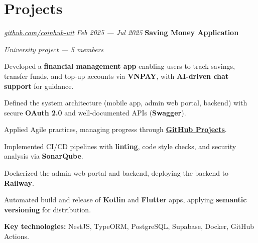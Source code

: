\section{Projects}

\begin{twocolentry}{
		\textit{\href{https://github.com/coinhub-uit}{github.com/coinhub-uit}}
		\textit{Feb 2025 --- Jul 2025}
	}
	\textbf{Saving Money Application}

	\textit{University project — 5 members}
\end{twocolentry}

\begin{onecolentry}
	\begin{highlights}
		\item Developed a \textbf{financial management app} enabling users to track savings, transfer funds, and
		top-up accounts via \textbf{VNPAY}, with \textbf{AI-driven chat support} for guidance.
		\item Defined the system architecture (mobile app, admin web portal, backend) with secure \textbf{OAuth
			2.0} and well-documented APIs (\textbf{Swagger}).
		\item Applied Agile practices, managing progress through
		\textbf{\href{https://github.com/orgs/coinhub-uit/projects/1}{GitHub Projects}}.
		\item Implemented CI/CD pipelines with \textbf{linting}, code style checks, and security analysis via
		\textbf{SonarQube}.
		\item Dockerized the admin web portal and backend, deploying the backend to \textbf{Railway}.
		\item Automated build and release of \textbf{Kotlin} and \textbf{Flutter} apps, applying \textbf{semantic
			versioning} for distribution.
		\item \textbf{Key technologies:} NestJS, TypeORM, PostgreSQL, Supabase, Docker, GitHub Actions.
	\end{highlights}
\end{onecolentry}
